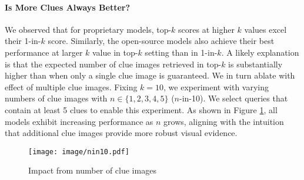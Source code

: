 
\paragraph{Is More Clues Always Better?}
We observed that for proprietary models, top-$k$ scores at higher $k$ values excel their 1-in-$k$ score. Similarly, the open-source models also achieve their best performance at larger $k$ value in top-$k$ setting than in 1-in-$k$.  A likely explanation is that the expected number of clue images retrieved in top-$k$ is substantially higher than when only a single clue image is guaranteed. We in turn ablate with effect of multiple clue images. Fixing $k=10$, we experiment with varying numbers of clue images with $n\in\{1,2,3,4,5\}$ ($n$-in-10). We select queries that contain at least 5 clues to enable this experiment. As shown in Figure \ref{fig:nin10}, all models exhibit increasing performance as $n$ grows, aligning with the intuition that additional clue images provide more robust visual evidence.

\begin{figure}
    \centering
    \texttt{[image: image/nin10.pdf]}
    \caption{Impact from number of clue images}
    \label{fig:nin10}
\end{figure}

